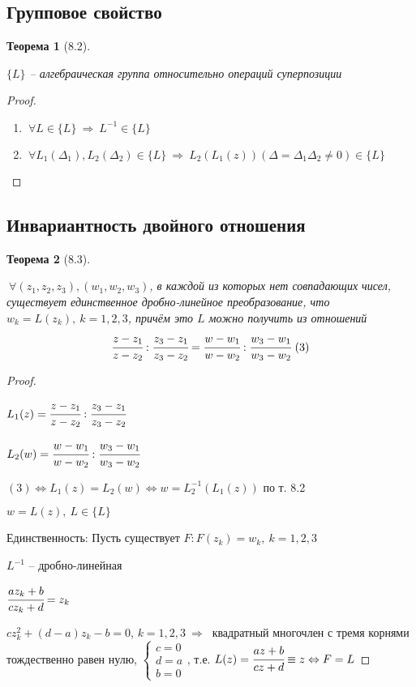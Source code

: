 \documentclass[draft]{report}
\newcommand{\forcenewline}{$\phantom{\mbox{newline}}$\newline}
\newcommand{\then}{\ \Rightarrow\ }
\newcommand{\LRA}{\Leftrightarrow}
\newcommand{\D}{\Delta}
\newcommand{\F}{\ \forall}
\newcommand{\sys}[1]{\left\{\begin{matrix}#1\end{matrix}\right.}
\newtheorem*{theor}{Теорема}
\theoremstyle{remark}
\begin{document}
\subsection{Групповое свойство}

\begin{theor}[8.2]
\forcenewline

$\{L\}$ -- алгебраическая группа относительно операций суперпозиции
\end{theor}

\begin{proof}
\forcenewline
\begin{enumerate}
\item $\F L\in\{L\}\then L^{-1}\in\{L\}$
\item $\F L_1(\D_1),L_2(\D_2)\in\{L\}\then L_2(L_1(z))(\D=\D_1\D_2\neq0)\in\{L\}$
\end{enumerate}
\end{proof}

\subsection{Инвариантность двойного отношения}
\begin{theor}[8.3]
\forcenewline

$\F(z_1,z_2,z_3),(w_1,w_2,w_3)$, в каждой из которых нет совпадающих чисел, существует единственное дробно-линейное преобразование, что $w_k=L(z_k),\ k=1,2,3$, причём это $L$ можно получить из отношений
$$
\cfrac{z-z_1}{z-z_2}:\cfrac{z_3-z_1}{z_3-z_2}=\cfrac{w-w_1}{w-w_2}:\cfrac{w_3-w_1}{w_3-w_2}\ (3)
$$
\end{theor}

\begin{proof}
\forcenewline

$L_1(z)=\cfrac{z-z_1}{z-z_2}:\cfrac{z_3-z_1}{z_3-z_2}$

$L_2(w)=\cfrac{w-w_1}{w-w_2}:\cfrac{w_3-w_1}{w_3-w_2}$

$(3) \LRA L_1(z)=L_2(w) \LRA w=L^{-1}_2(L_1(z))$ по т. 8.2

$w=L(z),\ L\in\{L\}$

Единственность: Пусть существует $F\colon F(z_k)=w_k,\ k=1,2,3$

$L^{-1}$ -- дробно-линейная

$\cfrac{az_k+b}{cz_k+d}=z_k$

$cz_k^2+(d-a)z_k-b=0$, $k=1,2,3 \then $ квадратный многочлен с тремя корнями тождественно равен нулю, $\sys{c=0 \\ d=a \\ b=0}$, т.е. $L(z)=\cfrac{az+b}{cz+d}\equiv z \LRA F=L$
\end{proof}
\end{document}
